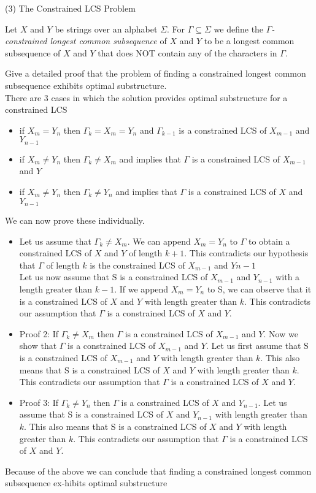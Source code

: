 \documentclass[11pt]{amsart}
\begin{document}
(3) The Constrained LCS Problem\medskip

Let $X$ and $Y$ be strings over an alphabet $\Sigma$. For $\Gamma\subseteq \Sigma$ we define the \emph{$\Gamma$-constrained longest common subsequence } of $X$ and $Y$ to be a longest common subsequence of $X$ and $Y$ that does NOT 
contain any of the characters in $\Gamma$.\medskip

Give a detailed proof that the problem of finding a constrained longest common subsequence exhibits optimal substructure.\\

There are 3 cases in which the solution provides optimal substructure for a constrained LCS
\begin{itemize}
    \item if $X_m = Y_n$ then $\Gamma_k=X_m=Y_n$ and $\Gamma_{k - 1}$ is a constrained LCS of $X_{m - 1}$ and $Y_{n - 1}$
    \item if $X_m \neq Y_n$ then $\Gamma_k \neq X_m$ and implies that $\Gamma$ is a constrained LCS of $X_{m - 1}$ and $Y$
    \item if $X_m \neq Y_n$ then $\Gamma_k \neq Y_n$ and implies that $\Gamma$ is a constrained LCS of $X$ and $Y_{n - 1}$
\end{itemize}
We can now prove these individually.
\begin{itemize}
    \item Let us assume that $\Gamma_k \neq X_m$. We can append $X_m = Y_n$ to $\Gamma$ to obtain a constrained LCS of $X$ and $Y$ of length $k + 1$. This contradicts our hypothesis that $\Gamma$ of length $k$ is the constrained LCS of $X_{m - 1}$ and $Y{n - 1}$\\
    Let us now assume that S is a constrained LCS of $X_{m - 1}$ and $Y_{n - 1}$ with a length greater than $k - 1$. If we append $X_m = Y_n$ to S, we can observe that it is a constrained LCS of $X$ and $Y$ with length greater than $k$. This contradicts our assumption that $\Gamma$ is a constrained LCS of $X$ and $Y$.
    \item Proof 2: If $\Gamma_k \neq X_m$ then $\Gamma$ is a constrained LCS of $X_{m - 1}$ and $Y$. Now we show that $\Gamma$ is a constrained LCS of $X_{m - 1}$ and $Y$. Let us first assume that S is a constrained LCS of $X_{m - 1}$ and $Y$ with length greater than $k$. This also means that S is a constrained LCS of $X$ and $Y$ with length greater than $k$. This contradicts our assumption that $\Gamma$ is a constrained LCS of $X$ and $Y$.
    \item Proof 3: If $\Gamma_k \neq Y_n$ then $\Gamma$ is a constrained LCS of $X$ and $Y_{n - 1}$. Let us assume that S is a constrained LCS of $X$ and $Y_{n - 1}$ with length greater than $k$. This also means that S is a constrained LCS of $X$ and $Y$ with length greater than $k$. This contradicts our assumption that $\Gamma$ is a constrained LCS of $X$ and $Y$.
\end{itemize}
Because of the above we can conclude that finding a constrained longest common subsequence ex-hibits optimal substructure
\end{document}
